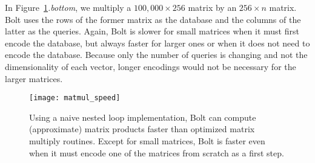 In Figure~\ref{fig:matmul_speed}\textit{.bottom}, we multiply a $100,000 \times 256$ matrix by an $256 \times n$ matrix. Bolt uses the rows of the former matrix as the database and the columns of the latter as the queries. Again, Bolt is slower for small matrices when it must first encode the database, but always faster for larger ones or when it does not need to encode the database. Because only the number of queries is changing and not the dimensionality of each vector, longer encodings would not be necessary for the larger matrices.


\begin{figure}[h]
\begin{center}
\label{fig:matmul_speed}
\texttt{[image: matmul\_speed]}
\caption{Using a naive nested loop implementation, Bolt can compute (approximate) matrix products faster than optimized matrix multiply routines. Except for small matrices, Bolt is faster even when it must encode one of the matrices from scratch as a first step.}
\end{center}
\end{figure}







